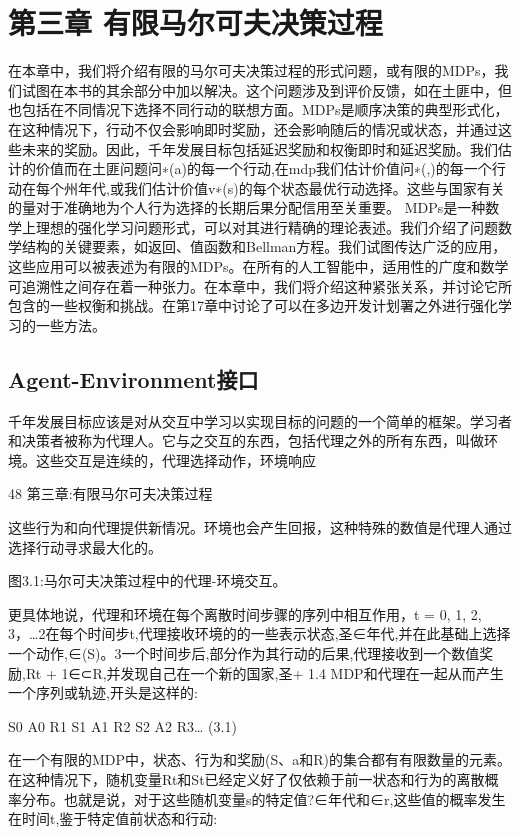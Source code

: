 
\chapter{第三章 有限马尔可夫决策过程}

在本章中，我们将介绍有限的马尔可夫决策过程的形式问题，或有限的MDPs，我们试图在本书的其余部分中加以解决。这个问题涉及到评价反馈，如在土匪中，但也包括在不同情况下选择不同行动的联想方面。MDPs是顺序决策的典型形式化，在这种情况下，行动不仅会影响即时奖励，还会影响随后的情况或状态，并通过这些未来的奖励。因此，千年发展目标包括延迟奖励和权衡即时和延迟奖励。我们估计的价值而在土匪问题问∗(a)的每一个行动,在mdp我们估计价值问∗(,)的每一个行动在每个州年代,或我们估计价值v∗(s)的每个状态最优行动选择。这些与国家有关的量对于准确地为个人行为选择的长期后果分配信用至关重要。
MDPs是一种数学上理想的强化学习问题形式，可以对其进行精确的理论表述。我们介绍了问题数学结构的关键要素，如返回、值函数和Bellman方程。我们试图传达广泛的应用，这些应用可以被表述为有限的MDPs。在所有的人工智能中，适用性的广度和数学可追溯性之间存在着一种张力。在本章中，我们将介绍这种紧张关系，并讨论它所包含的一些权衡和挑战。在第17章中讨论了可以在多边开发计划署之外进行强化学习的一些方法。

\section{Agent-Environment接口}

千年发展目标应该是对从交互中学习以实现目标的问题的一个简单的框架。学习者和决策者被称为代理人。它与之交互的东西，包括代理之外的所有东西，叫做环境。这些交互是连续的，代理选择动作，环境响应

48 					第三章:有限马尔可夫决策过程



这些行为和向代理提供新情况。环境也会产生回报，这种特殊的数值是代理人通过选择行动寻求最大化的。

图3.1:马尔可夫决策过程中的代理-环境交互。


更具体地说，代理和环境在每个离散时间步骤的序列中相互作用，t = 0, 1, 2, 3，…2在每个时间步t,代理接收环境的的一些表示状态,圣∈年代,并在此基础上选择一个动作,∈(S)。3一个时间步后,部分作为其行动的后果,代理接收到一个数值奖励,Rt + 1∈⊂R,并发现自己在一个新的国家,圣+ 1.4 MDP和代理在一起从而产生一个序列或轨迹,开头是这样的:

S0 A0 R1 S1 A1 R2 S2 A2 R3… 					(3.1)

在一个有限的MDP中，状态、行为和奖励(S、a和R)的集合都有有限数量的元素。在这种情况下，随机变量Rt和St已经定义好了仅依赖于前一状态和行为的离散概率分布。也就是说，对于这些随机变量s的特定值?∈年代和∈r,这些值的概率发生在时间t,鉴于特定值前状态和行动:

